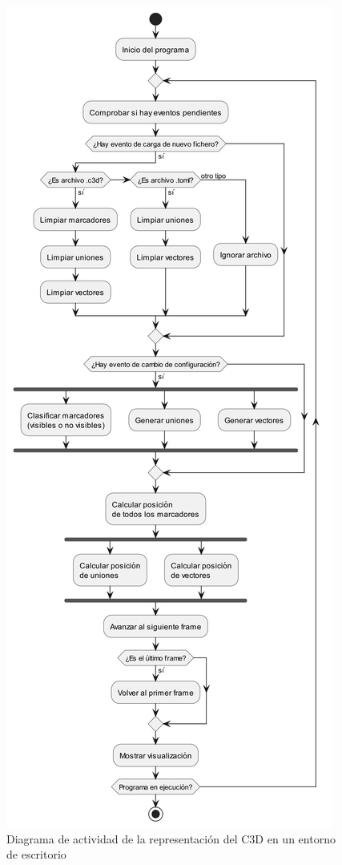 \begin{figure}[H]
  \centering
  \includegraphics[height=0.9\textheight, keepaspectratio]{imagenes/diagramas/general.png}
  \caption{Diagrama de actividad de la representación del \acs{C3D} en un entorno de escritorio}
  \label{fig:flujo}
\end{figure}

